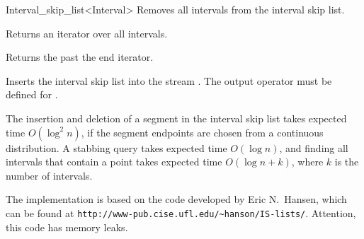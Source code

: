 \begin{ccRefClass} {Interval_skip_list<Interval>}
{Removes all intervals from the interval skip list.}



{Returns an iterator over all intervals.}

{Returns the past the end iterator.}




{Inserts the interval skip list  into the stream .
\ccPrecond The output operator must be defined for .}


\ccImplementation

The insertion and deletion of a segment in the interval skip list
takes expected time $O(\log^2 n)$, if the segment endpoints are
chosen from a continuous distribution. A stabbing query takes expected 
time $O(\log n)$, and finding all intervals that contain a point
takes expected time $O(\log n + k)$, where $k$ is the number of
intervals.

The implementation is based on the code developed by Eric N.~Hansen,
which can be found at \verb+http://www-pub.cise.ufl.edu/~hanson/IS-lists/+.
Attention, this code has memory leaks.
\end{ccRefClass}

